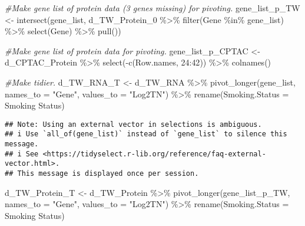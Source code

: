 \documentclass[
]{article}
\newenvironment{Shaded}{\begin{snugshade}}{\end{snugshade}}
\newcommand{\AttributeTok}[1]{\textcolor[rgb]{0.77,0.63,0.00}{#1}}
\newcommand{\CommentTok}[1]{\textcolor[rgb]{0.56,0.35,0.01}{\textit{#1}}}
\newcommand{\DecValTok}[1]{\textcolor[rgb]{0.00,0.00,0.81}{#1}}
\newcommand{\FunctionTok}[1]{\textcolor[rgb]{0.00,0.00,0.00}{#1}}
\newcommand{\NormalTok}[1]{#1}
\newcommand{\OtherTok}[1]{\textcolor[rgb]{0.56,0.35,0.01}{#1}}
\newcommand{\SpecialCharTok}[1]{\textcolor[rgb]{0.00,0.00,0.00}{#1}}
\newcommand{\StringTok}[1]{\textcolor[rgb]{0.31,0.60,0.02}{#1}}
\begin{document}
\begin{Shaded}
\begin{Highlighting}[]
\CommentTok{\#Make gene list of protein data (3 genes missing) for pivoting.}
\NormalTok{gene\_list\_p\_TW }\OtherTok{\textless{}{-}} \FunctionTok{intersect}\NormalTok{(gene\_list,  d\_TW\_Protein\_0 }\SpecialCharTok{\%\textgreater{}\%}
                                 \FunctionTok{filter}\NormalTok{(Gene }\SpecialCharTok{\%in\%}\NormalTok{ gene\_list) }\SpecialCharTok{\%\textgreater{}\%} 
                                 \FunctionTok{select}\NormalTok{(Gene) }\SpecialCharTok{\%\textgreater{}\%} 
                                 \FunctionTok{pull}\NormalTok{())}

\CommentTok{\#Make gene list of protein data for pivoting.}
\NormalTok{gene\_list\_p\_CPTAC }\OtherTok{\textless{}{-}}\NormalTok{ d\_CPTAC\_Protein }\SpecialCharTok{\%\textgreater{}\%} \FunctionTok{select}\NormalTok{(}\SpecialCharTok{{-}}\FunctionTok{c}\NormalTok{(Row.names, }\DecValTok{24}\SpecialCharTok{:}\DecValTok{42}\NormalTok{)) }\SpecialCharTok{\%\textgreater{}\%} \FunctionTok{colnames}\NormalTok{()}

\CommentTok{\#Make tidier.}
\NormalTok{d\_TW\_RNA\_T }\OtherTok{\textless{}{-}}\NormalTok{ d\_TW\_RNA }\SpecialCharTok{\%\textgreater{}\%} 
  \FunctionTok{pivot\_longer}\NormalTok{(gene\_list, }\AttributeTok{names\_to =} \StringTok{"Gene"}\NormalTok{, }\AttributeTok{values\_to =} \StringTok{"Log2TN"}\NormalTok{) }\SpecialCharTok{\%\textgreater{}\%} 
  \FunctionTok{rename}\NormalTok{(}\AttributeTok{Smoking.Status =} \StringTok{\textasciigrave{}}\AttributeTok{Smoking Status}\StringTok{\textasciigrave{}}\NormalTok{)}
\end{Highlighting}
\end{Shaded}

\begin{verbatim}
## Note: Using an external vector in selections is ambiguous.
## i Use `all_of(gene_list)` instead of `gene_list` to silence this message.
## i See <https://tidyselect.r-lib.org/reference/faq-external-vector.html>.
## This message is displayed once per session.
\end{verbatim}

\begin{Shaded}
\begin{Highlighting}[]
\NormalTok{d\_TW\_Protein\_T }\OtherTok{\textless{}{-}}\NormalTok{ d\_TW\_Protein }\SpecialCharTok{\%\textgreater{}\%} 
  \FunctionTok{pivot\_longer}\NormalTok{(gene\_list\_p\_TW, }\AttributeTok{names\_to =} \StringTok{"Gene"}\NormalTok{, }\AttributeTok{values\_to =} \StringTok{"Log2TN"}\NormalTok{) }\SpecialCharTok{\%\textgreater{}\%} 
  \FunctionTok{rename}\NormalTok{(}\AttributeTok{Smoking.Status =} \StringTok{\textasciigrave{}}\AttributeTok{Smoking Status}\StringTok{\textasciigrave{}}\NormalTok{)}
\end{Highlighting}
\end{Shaded}
\end{document}
